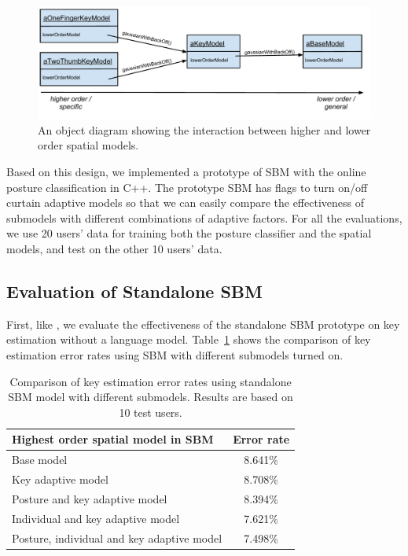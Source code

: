 \documentclass{sigchi}
\newcommand\tabhead[1]{\small\textbf{#1}}
\begin{document}
\begin{figure}[tb]
  \centering
  \includegraphics[width=1\columnwidth]{figures/chain-of-responsibility.pdf}
  \caption{An object diagram showing the interaction between higher and lower
  order spatial models.}
  \label{fig:chain-of-responsibility}
\end{figure}

Based on this design, we implemented a prototype of SBM with the online posture classification in C++. The prototype SBM has flags to turn on/off curtain adaptive models so that we can easily compare the effectiveness of submodels with different combinations of adaptive factors. For all the evaluations, we use 20 users' data for training both the posture classifier and the spatial models, and test on the other 10 users' data. 

\subsection{Evaluation of Standalone SBM}
First, like \cite{Findlater:2012, Rudchenko:2011}, we evaluate the effectiveness of the standalone SBM  prototype on key estimation without a language model. 
Table~\ref{tab:off-device} shows the comparison of
key estimation error rates using SBM with different submodels turned on.

\begin{table}[tb]
  \centering
  \begin{tabularx}{\columnwidth}{|X|c|}
  \hline
  \tabhead{Highest order spatial model in SBM} & \tabhead{Error rate} \\
  \hline
  \multicolumn{1}{|p{0.7\columnwidth}|}{Base model} & 8.641\% \\
  \hline
  Key adaptive model & 8.708\% \\
  \hline
  Posture and key adaptive model & 8.394\% \\
  \hline
  Individual and key adaptive model  & 7.621\%
  \\
  \hline
  Posture, individual and key adaptive model &  7.498\%
  \\
  \hline
  \end{tabularx}
  \caption{Comparison of key estimation error rates using standalone SBM model with different submodels. Results are based on 10 test users.}
  \label{tab:off-device}
\end{table}
\end{document}
